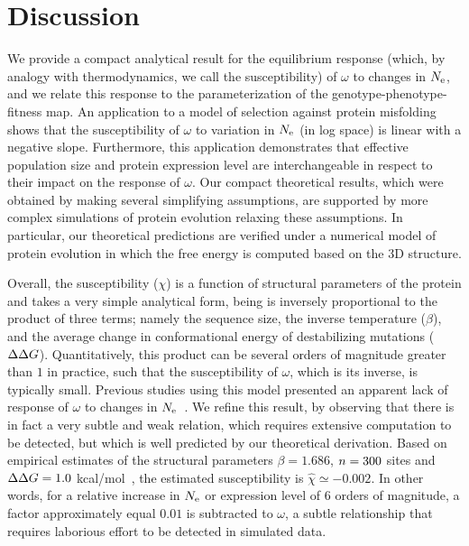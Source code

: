 \section{Discussion}

We provide a compact analytical result for the equilibrium response (which, by analogy with thermodynamics, we call the susceptibility) of $\omega$ to changes in $N_{\text{e}}$, and we relate this response to the parameterization of the genotype-phenotype-fitness map.
An application to a model of selection against protein misfolding shows that the susceptibility of $\omega$ to variation in $N_{\text{e}}$ (in log space) is linear with a negative slope.
Furthermore, this application demonstrates that effective population size and protein expression level are interchangeable in respect to their impact on the response of $\omega$.
Our compact theoretical results, which were obtained by making several simplifying assumptions, are supported by more complex simulations of protein evolution relaxing these assumptions.
In particular, our theoretical predictions are verified under a numerical model of protein evolution in which the free energy is computed based on the 3D structure.

Overall, the susceptibility ($\chi$) is a function of structural parameters of the protein and takes a very simple analytical form, being is inversely proportional to the product of three terms;
namely the sequence size, the inverse temperature ($\beta$), and the average change in conformational energy of destabilizing mutations ($\Delta \Delta G$).
Quantitatively, this product can be several orders of magnitude greater than $1$ in practice, such that the susceptibility of $\omega$, which is its inverse, is typically small.
Previous studies using this model presented an apparent lack of response of $\omega$ to changes in $N_{\text{e}}$~\citep{Goldstein2013}.
We refine this result, by observing that there is in fact a very subtle and weak relation, which requires extensive computation to be detected, but which is well predicted by our theoretical derivation.
Based on empirical estimates of the structural parameters $\beta = 1.686$, $n=300$ sites and $\Delta \Delta G = 1.0$ kcal/mol~\citep{Zeldovich2007}, the estimated susceptibility is $\hat{\chi} \simeq -0.002$.
In other words, for a relative increase in $N_{\text{e}}$ or expression level of $6$ orders of magnitude, a factor approximately equal $0.01$ is subtracted to $\omega$, a subtle relationship that requires laborious effort to be detected in simulated data.

